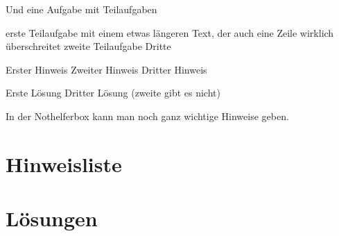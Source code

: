 \documentclass[12pt,a4paper,parskip=half,chapterprefix,bibliography=totoc,footheight=57pt,numbers=noendperiod]{scrreprt}
\begin{document}
    Und eine Aufgabe mit Teilaufgaben
    \begin{aufgabe}
        \begin{teilaufgaben}
            \teilaufgabe erste Teilaufgabe mit einem etwas längeren Text, der auch eine Zeile wirklich überschreitet
            \TextFeld{3cm}
            \teilaufgabe zweite Teilaufgabe
            \TextFeld{3cm}
            \teilaufgabe Dritte
        \end{teilaufgaben}
        \begin{bearbeitungshinweis}
            \begin{teilaufgaben}
                \teilaufgabe Erster Hinweis
                \teilaufgabe Zweiter Hinweis
                \teilaufgabe Dritter Hinweis
            \end{teilaufgaben}
        \end{bearbeitungshinweis}
        \begin{loesung}
            \begin{teilaufgaben}
                \teilaufgabe Erste Lösung
                \teilaufgabeOhneLoesung
                \teilaufgabe Dritter Lösung (zweite gibt es nicht)
            \end{teilaufgaben}
        \end{loesung}
    \end{aufgabe}
    \begin{nothelferBox}
        In der Nothelferbox kann man noch ganz wichtige Hinweise geben.
    \end{nothelferBox}


\chapter{Hinweisliste}
    \bearbeitungshinweisliste

\chapter{Lösungen}
    \printsolutions

\printbibliography
\end{document}
